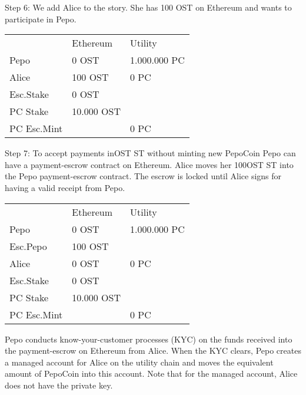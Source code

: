 \documentclass[12pt,a4paper, twocolumn]{article}
\begin{document}
Step 6: We add Alice to the story.  She has 100 OST on Ethereum and wants to participate in Pepo.
\begin{table}[H]
\centering
\label{Step-6}
\begin{tabular}{lll}
    & Ethereum    &   Utility   \\
Pepo        & 0 OST      & 1.000.000 PC \\
Alice       & 100 OST    & 0 PC         \\
Esc.Stake   & 0 OST      &              \\
PC Stake    & 10.000 OST &              \\
PC Esc.Mint &            & 0 PC        
\end{tabular}
\end{table} 

Step 7: To accept payments inOST ST without minting new PepoCoin Pepo can have a payment-escrow contract on Ethereum.  Alice moves her 100OST ST into the Pepo payment-escrow contract.  The escrow is locked until Alice signs for having a valid receipt from Pepo.
\begin{table}[H]
\centering
\label{Step-7}
\begin{tabular}{lll}
    & Ethereum    &   Utility   \\
Pepo        & 0 OST      & 1.000.000 PC \\
Esc.Pepo    & 100 OST    &              \\
Alice       & 0 OST      & 0 PC         \\
Esc.Stake   & 0 OST      &              \\
PC Stake    & 10.000 OST &              \\
PC Esc.Mint &            & 0 PC 
\end{tabular}
\end{table} 
Pepo conducts know-your-customer processes (KYC) on the funds received into the payment-escrow on Ethereum from Alice.  When the KYC clears, Pepo creates a managed account for Alice on the utility chain and moves the equivalent amount of PepoCoin into this account.  Note that for the managed account, Alice does not have the private key.\par
\end{document}
